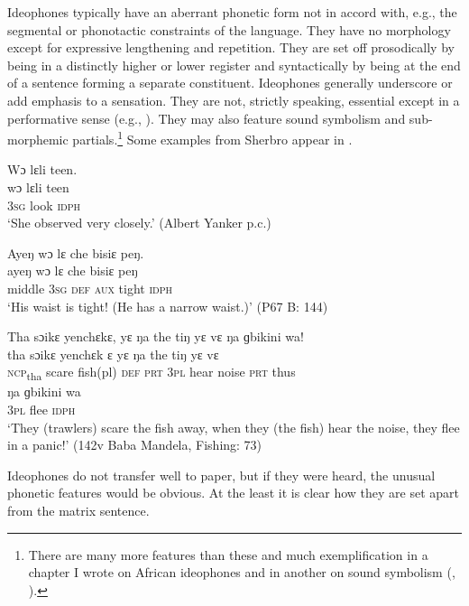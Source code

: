 Ideophones typically have an aberrant phonetic form not in accord with, e.g., the segmental or phonotactic constraints of the language. They have no morphology except for expressive lengthening and repetition. They are set off prosodically by being in a distinctly higher or lower register and syntactically by being at the end of a sentence forming a separate constituent. Ideophones generally underscore or add emphasis to a sensation. They are not, strictly speaking, essential except in a performative sense (e.g., \citealt{Dingemanse2009}). They may also feature sound symbolism and sub-morphemic partials.\footnote{There are many more features than these and much exemplification in a chapter I wrote on African ideophones and in another on sound symbolism (\citealt{Childs1994}, \citealt{Childs2015}).} Some examples from Sherbro appear in .

\ea%
\label{ex:76}
\ea Wɔ lɛli teen.\\
\gll wɔ  lɛli    teen\\
\textsc{3sg}  look    \textsc{idph}\\
\glt ‘She observed very closely.' (Albert Yanker p.c.)

\ex Ayeŋ wɔ lɛ   che bisiɛ peŋ.\\
\gll ayeŋ  wɔ    lɛ    che  bisiɛ  peŋ\\
middle  \textsc{3sg}  \textsc{def}  \textsc{aux}  tight  \textsc{idph}\\
\glt ‘His waist is tight! (He has a narrow waist.)' (P67 B: 144)

\newpage
\ex Tha sɔikɛ yenchɛkɛ, yɛ ŋa the tiŋ yɛ vɛ ŋa ɡbikini wa!\\
\gll tha    sɔikɛ    yenchɛk  ɛ    yɛ    ŋa    the   tiŋ    yɛ    vɛ\\
\textsc{ncp}\textsubscript{tha}  scare    fish(pl)  \textsc{def}  \textsc{prt}  \textsc{3pl}  hear  noise  \textsc{prt}  thus\\
\gll ŋa  ɡbikini  wa\\
\textsc{3pl}  flee    \textsc{idph}\\
\glt ‘They (trawlers) scare the fish away, when they (the fish) hear the noise, they flee in a panic!' (142v Baba Mandela, Fishing: 73)
\z
\z

Ideophones do not transfer well to paper, but if they were heard, the unusual phonetic features would be obvious. At the least it is clear how they are set apart from the matrix sentence.

